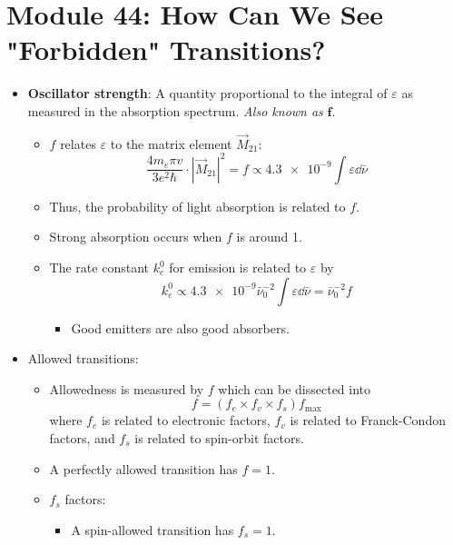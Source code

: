 \documentclass[../notes.tex]{subfiles}
\begin{document}
\section{Module 44: How Can We See "Forbidden" Transitions?}
\begin{itemize}
    \item \textbf{Oscillator strength}: A quantity proportional to the integral of $\varepsilon$ as measured in the absorption spectrum. \emph{Also known as} $\bm{f}$.
    \begin{itemize}
        \item $f$ relates $\varepsilon$ to the matrix element $\vec{M}_{21}$:
        \begin{equation*}
            \frac{4m_e\pi v}{3e^2\hbar}\cdot|\vec{M}_{21}|^2 = f \propto \num{4.3e-9}\int\varepsilon\dd{\bar{\nu}}
        \end{equation*}
        \item Thus, the probability of light absorption is related to $f$.
        \item Strong absorption occurs when $f$ is around 1.
        \item The rate constant $k^0_e$ for emission is related to $\varepsilon$ by
        \begin{equation*}
            k^0_e \propto \num{4.3e-9}\bar{\nu}^{-2}_0\int\varepsilon\dd{\bar{\nu}} = \bar{\nu}^{-2}_0f
        \end{equation*}
        \begin{itemize}
            \item Good emitters are also good absorbers.
        \end{itemize}
    \end{itemize}
    \item Allowed transitions:
    \begin{itemize}
        \item Allowedness is measured by $f$ which can be dissected into
        \begin{equation*}
            f = (f_e\times f_v\times f_s)f_\text{max}
        \end{equation*}
        where $f_e$ is related to electronic factors, $f_v$ is related to Franck-Condon factors, and $f_s$ is related to spin-orbit factors.
        \item A perfectly allowed transition has $f=1$.
        \item $f_s$ factors:
        \begin{itemize}
            \item A spin-allowed transition has $f_s=1$.

\end{itemize}
\end{itemize}
\end{itemize}
\end{document}
